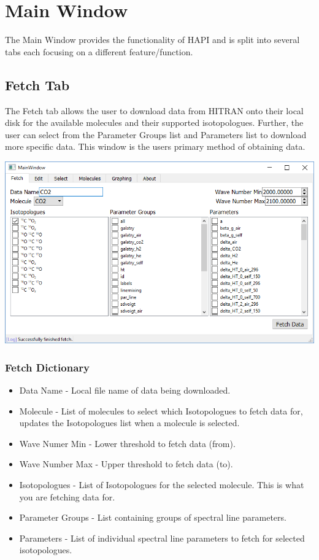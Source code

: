 \documentclass[12pt]{article}
\begin{document}
\section{Main Window}
The Main Window provides the functionality of HAPI and is split into several tabs each focusing on a different feature/function. 

\subsection{Fetch Tab}
The Fetch tab allows the user to download data from HITRAN onto their local disk for the available molecules and their supported isotopologues. Further, the user can select from the Parameter Groups list and Parameters list to download more specific data. This window is the users primary method of obtaining data.
\begin{center}
\includegraphics[scale = 0.6]{MainWindow_Fetch}
\end{center}

\subsubsection*{Fetch Dictionary}
\begin{itemize}
\item Data Name - Local file name of data being downloaded.
\item Molecule - List of molecules to select which Isotopologues to fetch data for, updates the Isotopologues list when a molecule is selected.
\item Wave Numer Min - Lower threshold to fetch data (from).
\item Wave Number Max - Upper threshold to fetch data (to).
\item Isotopologues - List of Isotopologues for the selected molecule. This is what you are fetching data for.
\item Parameter Groups - List containing groups of spectral line parameters.
\item Parameters - List of individual spectral line parameters to fetch for selected isotopologues.
\end{itemize}
\newpage
\end{document}
